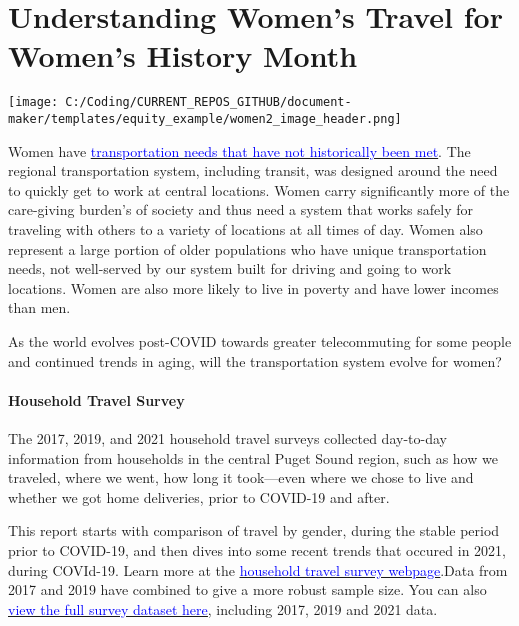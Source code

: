 \documentclass[
  12pt,
]{article}
\author{Suzanne Childress \& Meg Grzybowski}
\date{2023-02-16}
\begin{document}
\setmainfont{Poppins}

\hypertarget{understanding-womens-travel-for-womens-history-month}{%
\section{Understanding Women's Travel for Women's History
Month}\label{understanding-womens-travel-for-womens-history-month}}

\texttt{[image: C:/Coding/CURRENT\_REPOS\_GITHUB/document-maker/templates/equity\_example/women2\_image\_header.png]}

Women have
\href{http://libraryarchives.metro.net/DB_Attachments/2019-0294/UnderstandingHowWomenTravel_FullReport_FINAL.pdf}{\underline{\textcolor{blue}{transportation needs that have not historically been met}}}.
The regional transportation system, including transit, was designed
around the need to quickly get to work at central locations. Women carry
significantly more of the care-giving burden's of society and thus need
a system that works safely for traveling with others to a variety of
locations at all times of day. Women also represent a large portion of
older populations who have unique transportation needs, not well-served
by our system built for driving and going to work locations. Women are
also more likely to live in poverty and have lower incomes than men.

As the world evolves post-COVID towards greater telecommuting for some
people and continued trends in aging, will the transportation system
evolve for women?

\hypertarget{household-travel-survey}{%
\paragraph{Household Travel Survey}\label{household-travel-survey}}

The 2017, 2019, and 2021 household travel surveys collected day-to-day
information from households in the central Puget Sound region, such as
how we traveled, where we went, how long it took---even where we chose
to live and whether we got home deliveries, prior to COVID-19 and after.

This report starts with comparison of travel by gender, during the
stable period prior to COVID-19, and then dives into some recent trends
that occured in 2021, during COVId-19. Learn more at the
\href{https://www.psrc.org/our-work/household-travel-survey-program}{\underline{\textcolor{blue}{household travel survey webpage}}}.Data
from 2017 and 2019 have combined to give a more robust sample size. You
can also
\href{https://household-travel-survey-psregcncl.hub.arcgis.com}{\underline{\textcolor{blue}{view the full survey dataset here}}},
including 2017, 2019 and 2021 data.
\end{document}
